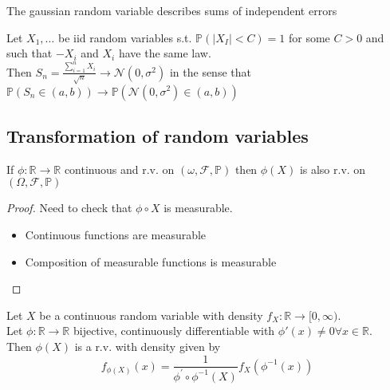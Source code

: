 \documentclass[../main.tex]{subfiles}
\begin{document}
The gaussian random variable describes sums of independent errors
\begin{thm}
	Let $X_1,\ldots$ be iid random variables s.t. $ \mathbb{P}( |X_I|<C) =1$ for some $C>0$ and such that $-X_i$ and $X_i$ have the same law.\\
	Then $ S_n=\frac{ \sum_{i=1}^{ n}X_i}{ \sqrt{n} }\to \mathcal{N}( 0, \sigma^{2}) $ in the sense that $ \mathbb{P}( S_n\in ( a,b) ) \to \mathbb{P}( \mathcal{N}( 0, \sigma^{2}) \in ( a,b) ) 	 $ 
\end{thm}
\subsection{Transformation of random variables}
\begin{lemma}
If $\phi: \mathbb{R}\to \mathbb{R}$ continuous and r.v. on $( \omega, \mathcal{F}, \mathbb{P}) $ then $\phi( X) $ is also r.v. on $( \Omega, \mathcal{F}, \mathbb{P}) $ 
\end{lemma}
\begin{proof}
Need to check that $\phi\circ X$ is measurable.
\begin{itemize}
\item Continuous functions are measurable
\item Composition of measurable functions is measurable
\end{itemize}

\end{proof}
\begin{propo}
Let $X$ be a continuous random variable with density $f_X: \mathbb{R}\to [ 0, \infty ) $.\\
Let $\phi: \mathbb{R}\to \mathbb{R}$ bijective, continuously differentiable with $ \phi'( x) \neq 0\forall x \in \mathbb{R}$.\\
Then $\phi( X) $ is a r.v. with density given by
\[ 
f_{\phi( X) } ( x) = \frac{1}{\phi^{'}\circ\phi^{-1}( X) } f_X( \phi^{-1}( x) ) 
\]

\end{propo}
\end{document}
